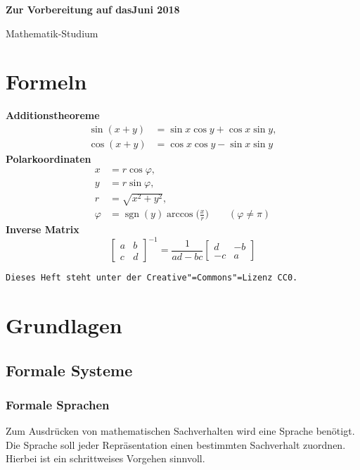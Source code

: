 \documentclass[a4paper,11pt,fleqn,twoside]{scrartcl}
\numberwithin{equation}{section}
\newcommand{\strong}[1]{{\normalfont\sffamily\bfseries #1}}
\theoremstyle{rmbox}
\begin{document}
\thispagestyle{empty}

\noindent
{\huge\sffamily\bfseries
Zur Vorbereitung auf das\hfill {\normalsize\rmfamily\mdseries Juni 2018}
\par\noindent
Mathematik-Studium
\par}

\tableofcontents

\newpage
\section*{Formeln}
\strong{Additionstheoreme}
\begin{align*}
\sin(x+y) &= \sin x\cos y + \cos x\sin y,\\
\cos(x+y) &= \cos x\cos y - \sin x\sin y
\end{align*}
\strong{Polarkoordinaten}
\begin{align*}
x &= r\cos\varphi,\\
y &= r\sin\varphi,\\
r &= \sqrt{x^2+y^2},\\
\varphi &= \operatorname{sgn}(y)\arccos\Big(\frac{x}{r}\Big)\qquad (\varphi\ne\pi)
\end{align*}
\strong{Inverse Matrix}
\[
\begin{bmatrix}
a & b\\
c & d
\end{bmatrix}^{-1}
= \frac{1}{ad-bc} \begin{bmatrix}
d & -b\\
-c & a
\end{bmatrix}
\]

\vfill
\texttt{Dieses Heft steht unter der Creative"=Commons"=Lizenz CC0.}

\newpage

\section{Grundlagen}
\subsection{Formale Systeme}
\subsubsection{Formale Sprachen}

Zum Ausdrücken von mathematischen Sachverhalten wird eine Sprache
benötigt. Die Sprache soll jeder Repräsentation einen bestimmten
Sachverhalt zuordnen. Hierbei ist ein schrittweises Vorgehen
sinnvoll.
\end{document}
